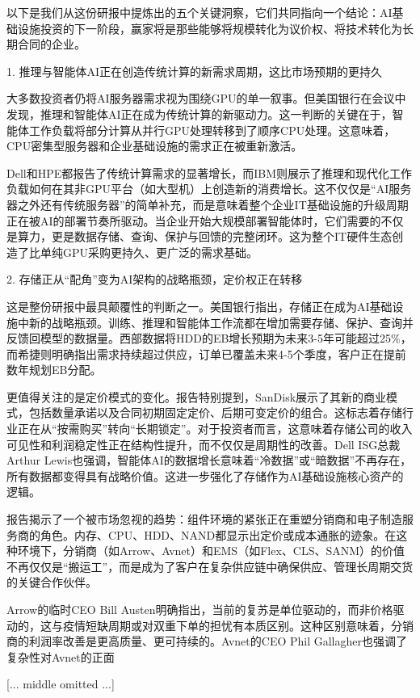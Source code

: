 \documentclass[11pt]{ctexart}
\begin{document}
以下是我们从这份研报中提炼出的五个关键洞察，它们共同指向一个结论：AI基础设施投资的下一阶段，赢家将是那些能够将规模转化为议价权、将技术转化为长期合同的企业。

1. 推理与智能体AI正在创造传统计算的新需求周期，这比市场预期的更持久

大多数投资者仍将AI服务器需求视为围绕GPU的单一叙事。但美国银行在会议中发现，推理和智能体AI正在成为传统计算的新驱动力。这一判断的关键在于，智能体工作负载将部分计算从并行GPU处理转移到了顺序CPU处理。这意味着，CPU密集型服务器和企业基础设施的需求正在被重新激活。

Dell和HPE都报告了传统计算需求的显著增长，而IBM则展示了推理和现代化工作负载如何在其非GPU平台（如大型机）上创造新的消费增长。这不仅仅是“AI服务器之外还有传统服务器”的简单补充，而是意味着整个企业IT基础设施的升级周期正在被AI的部署节奏所驱动。当企业开始大规模部署智能体时，它们需要的不仅是算力，更是数据存储、查询、保护与回馈的完整闭环。这为整个IT硬件生态创造了比单纯GPU采购更持久、更广泛的需求基础。

2. 存储正从“配角”变为AI架构的战略瓶颈，定价权正在转移

这是整份研报中最具颠覆性的判断之一。美国银行指出，存储正在成为AI基础设施中新的战略瓶颈。训练、推理和智能体工作流都在增加需要存储、保护、查询并反馈回模型的数据量。西部数据将HDD的EB增长预期为未来3-5年可能超过25\%，而希捷则明确指出需求持续超过供应，订单已覆盖未来4-5个季度，客户正在提前数年规划EB分配。

更值得关注的是定价模式的变化。报告特别提到，SanDisk展示了其新的商业模式，包括数量承诺以及合同初期固定定价、后期可变定价的组合。这标志着存储行业正在从“按需购买”转向“长期锁定”。对于投资者而言，这意味着存储公司的收入可见性和利润稳定性正在结构性提升，而不仅仅是周期性的改善。Dell ISG总裁Arthur Lewis也强调，智能体AI的数据增长意味着“冷数据”或“暗数据”不再存在，所有数据都变得具有战略价值。这进一步强化了存储作为AI基础设施核心资产的逻辑。

报告揭示了一个被市场忽视的趋势：组件环境的紧张正在重塑分销商和电子制造服务商的角色。内存、CPU、HDD、NAND都显示出定价或成本通胀的迹象。在这种环境下，分销商（如Arrow、Avnet）和EMS（如Flex、CLS、SANM）的价值不再仅仅是“搬运工”，而是成为了客户在复杂供应链中确保供应、管理长周期交货的关键合作伙伴。

Arrow的临时CEO Bill Austen明确指出，当前的复苏是单位驱动的，而非价格驱动的，这与疫情短缺周期或对双重下单的担忧有本质区别。这种区别意味着，分销商的利润率改善是更高质量、更可持续的。Avnet的CEO Phil Gallagher也强调了复杂性对Avnet的正面

[... middle omitted ...]
\end{document}
